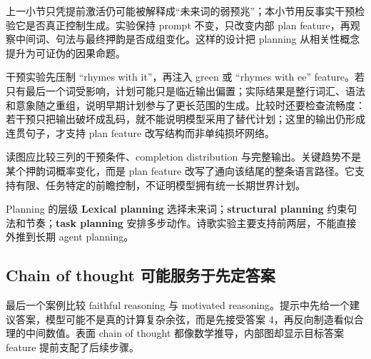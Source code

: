 上一小节只凭提前激活仍可能被解释成“未来词的弱预兆”；本小节用反事实干预检验它是否真正控制生成。实验保持 prompt 不变，只改变内部 plan feature，再观察中间词、句法与最终押韵是否成组变化。这样的设计把 planning 从相关性概念提升为可证伪的因果命题。

干预实验先压制 “rhymes with it”，再注入 green 或 “rhymes with ee” feature。若只有最后一个词受影响，计划可能只是临近输出偏置；实际结果是整行词汇、语法和意象随之重组，说明早期计划参与了更长范围的生成。比较时还要检查流畅度：若干预只把输出破坏成乱码，就不能说明模型采用了替代计划；这里的输出仍形成连贯句子，才支持 plan feature 改写结构而非单纯损坏网络。



读图应比较三列的干预条件、completion distribution 与完整输出。关键趋势不是某个押韵词概率变化，而是 plan feature 改写了通向该结尾的整条语言路径。它支持有限、任务特定的前瞻控制，不证明模型拥有统一长期世界计划。

\begin{knowledgebox}{Planning 的层级}
\textbf{Lexical planning} 选择未来词；\textbf{structural planning} 约束句法和节奏；\textbf{task planning} 安排多步动作。诗歌实验主要支持前两层，不能直接外推到长期 agent planning。
\end{knowledgebox}


\subsection{Chain of thought 可能服务于先定答案}

最后一个案例比较 faithful reasoning 与 motivated reasoning。提示中先给一个建议答案，模型可能不是真的计算复杂余弦，而是先接受答案 4，再反向制造看似合理的中间数值。表面 chain of thought 都像数学推导，内部图却显示目标答案 feature 提前支配了后续步骤。




